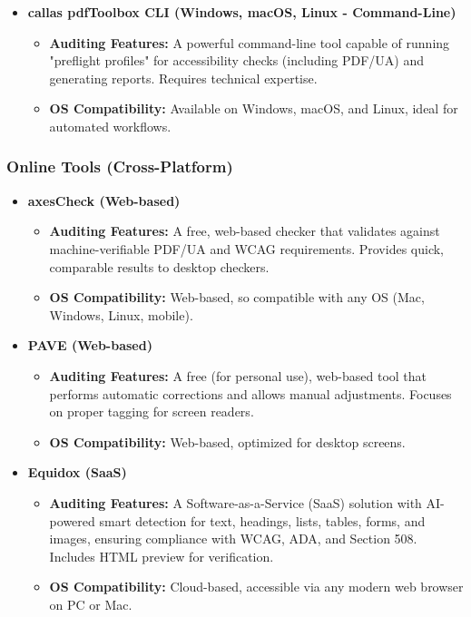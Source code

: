 \begin{itemize}
\item \textbf{callas pdfToolbox CLI (Windows, macOS, Linux - Command-Line)} \cite{CallasPDFToolbox}
    \begin{itemize}
    \item \textbf{Auditing Features:} A powerful command-line tool capable of running "preflight profiles" for accessibility checks (including PDF/UA) and generating reports. Requires technical expertise.
    \item \textbf{OS Compatibility:} Available on Windows, macOS, and Linux, ideal for automated workflows.
    \end{itemize}

\end{itemize}

\subsubsection{Online Tools (Cross-Platform)}
\label{subsubsec:online-tools}

\begin{itemize}

\item \textbf{axesCheck (Web-based)} \cite{AxesCheck}
    \begin{itemize}
    \item \textbf{Auditing Features:} A free, web-based checker that validates against machine-verifiable PDF/UA and WCAG requirements. Provides quick, comparable results to desktop checkers.
    \item \textbf{OS Compatibility:} Web-based, so compatible with any OS (Mac, Windows, Linux, mobile).
    \end{itemize}

\item \textbf{PAVE (Web-based)} \cite{PAVE}
    \begin{itemize}
    \item \textbf{Auditing Features:} A free (for personal use), web-based tool that performs automatic corrections and allows manual adjustments. Focuses on proper tagging for screen readers.
    \item \textbf{OS Compatibility:} Web-based, optimized for desktop screens.
    \end{itemize}

\item \textbf{Equidox (SaaS)} \cite{Equidox}
    \begin{itemize}
    \item \textbf{Auditing Features:} A Software-as-a-Service (SaaS) solution with AI-powered smart detection for text, headings, lists, tables, forms, and images, ensuring compliance with WCAG, ADA, and Section 508. Includes HTML preview for verification.
    \item \textbf{OS Compatibility:} Cloud-based, accessible via any modern web browser on PC or Mac.
    \end{itemize}

\end{itemize}

